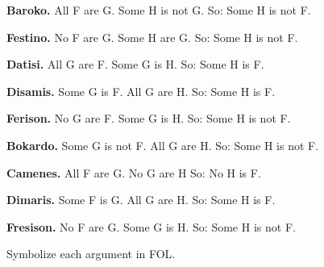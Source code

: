 \begin{compactlist}
	\item \textbf{Baroko.} All F are G. Some H is not G. So: Some H is not F.
	\item[] 
	\item \textbf{Festino.} No F are G. Some H are G. So: Some H is not F.
	\item[] 
	\item \textbf{Datisi.} All G are F. Some G is H. So: Some H is F.
	\item[] 
	\item \textbf{Disamis.} Some G is F. All G are H. So: Some H is F.
	\item[] 
	\item \textbf{Ferison.} No G are F. Some G is H. So: Some H is not F.
	\item[] 
	\item \textbf{Bokardo.} Some G is not F. All G are H. So:  Some H is not F.
	\item[] 
	\item \textbf{Camenes.} All F are G. No G are H So: No H is F.
	\item[] 
	\item \textbf{Dimaris.} Some F is G. All G are H. So: Some H is F.
	\item[] 
	\item \textbf{Fresison.} No F are G. Some G is H. So: Some H is not F.
	\item[] 
\end{compactlist}
Symbolize each argument in FOL.

